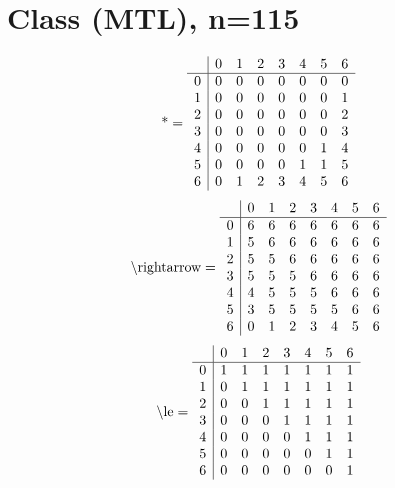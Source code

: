 \documentclass[11pt]{article}
\begin{document}
\section{Class (MTL), n=115}
\[\text{*} = 
\begin{array}{r | r r r r r r r}
 & 0 & 1 & 2 & 3 & 4 & 5 & 6 \\ \hline
0 & 0 & 0 & 0 & 0 & 0 & 0 & 0 \\
1 & 0 & 0 & 0 & 0 & 0 & 0 & 1 \\
2 & 0 & 0 & 0 & 0 & 0 & 0 & 2 \\
3 & 0 & 0 & 0 & 0 & 0 & 0 & 3 \\
4 & 0 & 0 & 0 & 0 & 0 & 1 & 4 \\
5 & 0 & 0 & 0 & 0 & 1 & 1 & 5 \\
6 & 0 & 1 & 2 & 3 & 4 & 5 & 6 \\
\end{array}
\]
\[\text{\textbackslash rightarrow} = 
\begin{array}{r | r r r r r r r}
 & 0 & 1 & 2 & 3 & 4 & 5 & 6 \\ \hline
0 & 6 & 6 & 6 & 6 & 6 & 6 & 6 \\
1 & 5 & 6 & 6 & 6 & 6 & 6 & 6 \\
2 & 5 & 5 & 6 & 6 & 6 & 6 & 6 \\
3 & 5 & 5 & 5 & 6 & 6 & 6 & 6 \\
4 & 4 & 5 & 5 & 5 & 6 & 6 & 6 \\
5 & 3 & 5 & 5 & 5 & 5 & 6 & 6 \\
6 & 0 & 1 & 2 & 3 & 4 & 5 & 6 \\
\end{array}
\]
\[\text{\textbackslash le} = 
\begin{array}{r | r r r r r r r}
 & 0 & 1 & 2 & 3 & 4 & 5 & 6 \\ \hline
0 & 1 & 1 & 1 & 1 & 1 & 1 & 1 \\
1 & 0 & 1 & 1 & 1 & 1 & 1 & 1 \\
2 & 0 & 0 & 1 & 1 & 1 & 1 & 1 \\
3 & 0 & 0 & 0 & 1 & 1 & 1 & 1 \\
4 & 0 & 0 & 0 & 0 & 1 & 1 & 1 \\
5 & 0 & 0 & 0 & 0 & 0 & 1 & 1 \\
6 & 0 & 0 & 0 & 0 & 0 & 0 & 1 \\
\end{array}
\]
\end{document}

